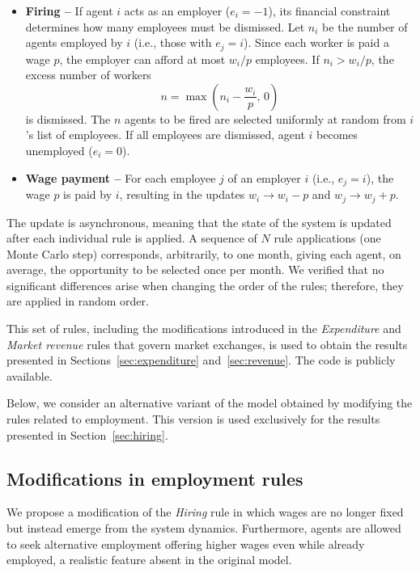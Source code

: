 \documentclass[12pt,preprint]{revtex4-1}
\begin{document}
\begin{itemize}
\item {\bf Firing --} If agent $i$ acts as an employer ($e_i=-1$), its financial constraint determines how many employees must be dismissed. Let $n_i$ be the number of agents employed by $i$ (i.e., those with $e_j=i$). Since each worker is paid a wage $p$, the employer can afford at most $w_i/p$ employees. If $n_i > w_i/p$, the excess number of workers
\begin{equation*}
n = \max\!\left(n_i - \frac{w_i}{p},\,0\right)
\end{equation*}
is dismissed. The $n$ agents to be fired are selected uniformly at random from $i$’s list of employees. If all employees are dismissed, agent $i$ becomes unemployed ($e_i=0$).

\item {\bf Wage payment --} 
For each employee $j$ of an employer $i$ (i.e., $e_j=i$), the wage $p$ is paid by $i$, resulting in the updates $w_i \to w_i - p$ and $w_j \to w_j + p$.
\end{itemize}



The update is asynchronous, meaning that the state of the system is updated after each individual rule is applied. A sequence of $N$ rule applications (one Monte Carlo step) corresponds, arbitrarily, to one month, giving each agent, on average, the opportunity to be selected once per month. We verified that no significant differences arise when changing the order of the rules; therefore, they are applied in random order. 
 

This set of rules, including the modifications introduced in the {\it Expenditure} and {\it Market revenue} rules that govern market exchanges, is used to obtain the results presented in Sections~\ref{sec:expenditure} and~\ref{sec:revenue}. 
The code is publicly available\cite{code}.


Below, we consider an alternative variant of the model obtained by modifying the rules related to employment. This version is used exclusively for the results presented in Section~\ref{sec:hiring}.


\subsection*{Modifications in employment rules}

\label{modifications}

We propose a modification of the {\it Hiring} rule in which wages are no longer fixed but instead emerge from the system dynamics. Furthermore, agents are allowed to seek alternative employment offering higher wages even while already employed, a realistic feature absent in the original model.
\end{document}
